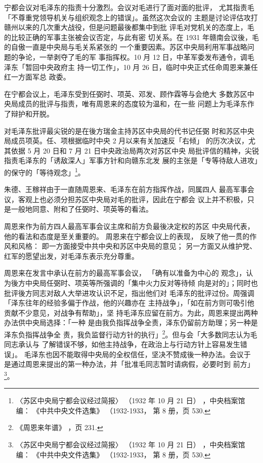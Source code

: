 宁都会议对毛泽东的指责十分激烈。会议对毛进行了面对面的批评，
尤其指责毛「不尊重党领导机关与组织观念上的错误」。虽然这次会议的
主题是讨论评估攻打赣州以来的几次重大战役，但是问题最後都集中到批
评毛对党机关的态度上，毛的比较正确的军事主张被会议否定，与此有密
切关系。在 1931 年赣南会议後，毛的自傲一直是中央局与毛关系紧张的
一个重要因素。苏区中央局利用军事战略问题的争论，一举剥夺了毛的军
事指挥权。10 月 12 日，中革军委发布通令，调毛泽东「暂回中央政府主
持一切工作」，10 月 26 日，临时中央正式任命周恩来兼任红一方面军总
政委。

在宁都会议上，毛泽东受到任弼时、项英、邓发、顾作霖等与会绝大
多数苏区中央局成员的批评与指责，唯有周恩来的态度较为温和，在一些
问题上为毛泽东作了辩护和开脱。

对毛泽东批评最尖锐的是在後方瑞金主持苏区中央局的代书记任弼
时和苏区中央局成员项英。任、项根据临时中央 2 月以来有关加速反「右倾」
的历次决议，尤其依据 5 月 20 日和 7 月 21 日中央政治局两次对苏区中央
局批评信的精神，尖锐指责毛泽东的「诱敌深人」军事方针和向赣东北发
展的主张是「专等待敌人进攻」的保守的「等待观念」\footnote{〈苏区中央局宁都会议经过简报〉
（1932 年 10 月 21 日）
，中央档案馆编：
《中共中央文件选集》
（1932-1933，
第 8 册，页 530.}。

朱德、王稼祥由于一直随周恩来、毛泽东在前方指挥作战，同属四人
最高军事会议，客观上也必须分担苏区中央局对毛的批评，因此在宁都会
议上并不积极，只是一般地同意、附和了任弼时、项英等的看法。

周恩来作为前方四人最高军事会议主席和前方负最後决定权的苏区
中央局代表，
他的看法和态度是至关重要的。
周恩来在宁都会议上的表现，
反映了他一贯的作风和风格：
即一方面接受中共中央和苏区中央局的意见；
另一方面又从维护党、红军的愿望出发，对毛泽东表示充分尊重。

周恩来在发言中承认在前方的最高军事会议，
「确有以准备为中心的
观念」，认为後方中央局任弼时、项英等所强调的「集中火力反对等待倾
向是对的」；同时也批评後方同志对敌人大举进攻认识不足，指出他们对
毛泽东的批评过份。周强调「泽东往年的经验多偏于作战，他的兴趣亦在
主持战争」，「如在前方则可吸引他贡献不少意见，对战争有帮助」，坚
持毛泽东应留在前方。为此，周恩来提出两种办法供中央局选择：「一种
是由我负指挥战争全责，泽东仍留前方助理；另一种是泽东负指挥战争全
责，我负监督行动方针的执行」\footnote{《周恩来年谱》
，页 231.}。但与会「大多数同志认为毛同志承认与
了解错误不够，如他主持战争，在政治上与行动方针上容易发生错误」。
毛泽东也因不能取得中央局的全权信任，坚决不赞成後一种办法。会议于
是通过周恩来提出的第一种办法，并「批准毛同志暂时请病假，必要时到
前方」\footnote{〈苏区中央局宁都会议经过简报〉
（1932 年 10 月 21 日）
，中央档案馆编：
《中共中央文件选集》
（1932-1933，
第 8 册，页 530.}。

